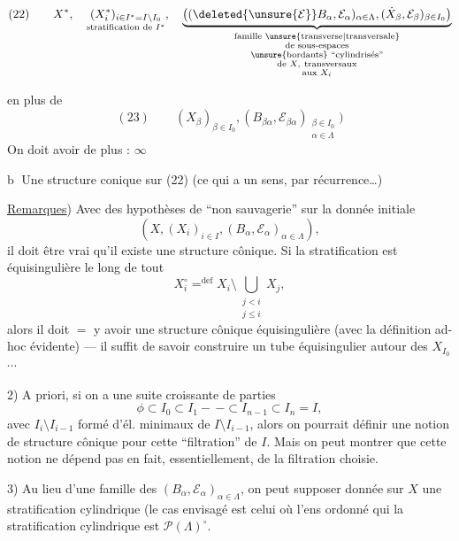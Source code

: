 \[
(22)\qquad
X^*,\quad
\underset{\text{stratification de }I^*}{(X_i^*)_{i\in I^*=I\setminus I_0}},
\quad
\underbrace{\big((\deleted{\unsure{\mathcal E}}B_\alpha,\mathcal E_\alpha)_{\alpha\in\Lambda},
(\dot X_\beta,\mathcal E_\beta)_{\beta\in I_0}\big)}
_{\substack{\text{famille \unsure{transverse|transversale}}\\\text{de sous-espaces}\\
\text{\unsure{bordants} ``cylindrisés''}\\
\text{de }X,\ \text{transversaux}\\\text{aux }X_i}}
\]

en plus de
\[
(23)\qquad
(X_\beta)_{\beta\in I_0},
(B_{\beta\alpha},\mathcal E_{\beta\alpha})_{\substack{\beta\in I_0\\\alpha\in\Lambda}}\big)
\]
On doit avoir de plus : $\infty$

\textcircled{b} Une structure conique sur (22) (ce qui
a un sens, par récurrence\ldots)


\quad \uline{Remarques}) Avec des hypothèses de ``non sauvagerie'' sur la donnée initiale
\[
 (X,(X_i)_{i\in I},(B_\alpha,\mathcal E_\alpha)_{\alpha\in\Lambda}),
\]
il doit être vrai qu'il existe une structure cônique. Si la stratification
 est équisingulière le long de tout
\[
 X_i^\circ\mathrel{\mathop=^{\mathrm{def}}}
 X_i\setminus\bigcup_{\substack{j<i\\j\le i}}X_j,
\]
alors il doit \(=\) y avoir une structure cônique équisingulière
(avec la définition ad-hoc évidente) --- il suffit de savoir construire
un tube équisingulier autour des \(X_{I_0}\) \(\cdots\)

2) A priori, si on a une suite  croissante
de parties
\[
 \phi\subset I_0\subset I_1-\, -\subset I_{n-1}\subset I_n=I,
\]
avec 
 \(I_i\setminus I_{i-1}\) formé d'él. minimaux
de \(I\setminus I_{i-1}\), alors on pourrait définir
 une notion de structure cônique
pour cette ``filtration'' de \(I\). Mais on
peut montrer que cette notion ne dépend pas
en fait, essentiellement, de la filtration
choisie.

3) Au lieu d'une famille des \((B_\alpha,\mathcal E_\alpha)_{\alpha\in\Lambda}\),
on peut supposer donnée sur \(X\) une
stratification cylindrique  (le cas envisagé
est celui où l'ens ordonné qui 
 la stratification cylindrique est
\(\mathcal P(\Lambda)^\circ\).

